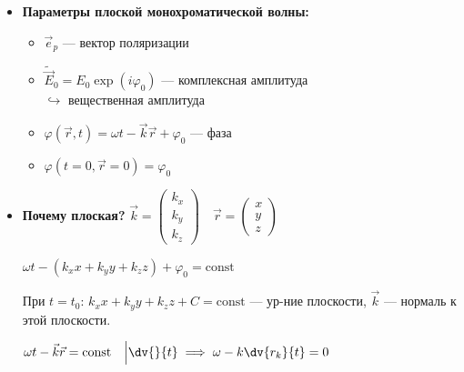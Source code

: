 \begin{itemize}
	\item \textbf{Параметры плоской монохроматической волны:}
	\begin{itemize}
		\item $\vec{e}_p$ --- вектор поляризации
		\item $\widetilde{\vec{E}}_0 = E_0 \exp(i\varphi_0)$ --- комплексная амплитуда \\
		$\hookrightarrow$ вещественная амплитуда
		\item $\varphi(\vec{r}, t) = \omega t - \vec{k}\vec{r} + \varphi_0$ --- фаза
		\item $\varphi(t=0, \vec{r}=0) = \varphi_0$
	\end{itemize}
\end{itemize}

\begin{itemize}
	\item \textbf{Почему плоская?} 
	$\vec{k} = \begin{pmatrix} k_x \\ k_y \\ k_z \end{pmatrix} \quad \vec{r} = \begin{pmatrix} x \\ y \\ z \end{pmatrix}$
	
	$\omega t - (k_x x + k_y y + k_z z) + \varphi_0 = \text{const}$
	
	При $t = t_0$:
	$k_x x + k_y y + k_z z + C = \text{const}$ --- ур-ние плоскости, $\vec{k}$ --- нормаль к этой плоскости.
	
	$\omega t - \vec{k}\vec{r} = \text{const} \quad \Big| \dv{}{t} \implies \omega - k \dv{r_k}{t} = 0$
\end{itemize}

